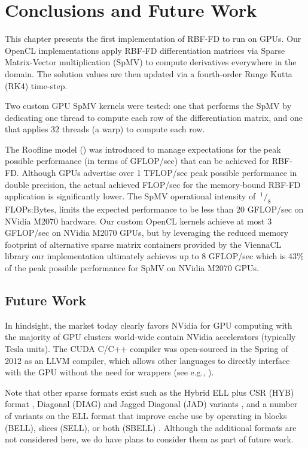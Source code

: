 \documentclass{report}
\begin{document}
\section{Conclusions and Future Work}

This chapter presents the first implementation of RBF-FD to run on GPUs. Our OpenCL implementations apply RBF-FD differentiation matrices via Sparse Matrix-Vector multiplication (SpMV) to compute derivatives everywhere in the domain. The solution values are then updated via a fourth-order Runge Kutta (RK4) time-step. 

Two custom GPU SpMV kernels were tested: one that performs the SpMV by dedicating one thread to compute each row of the differentiation matrix, and one that applies 32 threads (a warp) to compute each row. 

The Roofline model (\cite{Williams2009}) was introduced to manage expectations for the peak possible performance (in terms of GFLOP/sec) that can be achieved for RBF-FD. Although GPUs advertise over 1 TFLOP/sec peak possible performance in double precision, the actual achieved FLOP/sec for the memory-bound RBF-FD application is significantly lower. The SpMV operational intensity of $\ ^{1}/_{8}$ FLOPs:Bytes, limits the expected performance to be less than 20 GFLOP/sec on NVidia M2070 hardware. Our custom OpenCL kernels achieve at most 3 GFLOP/sec on NVidia M2070 GPUs, but by leveraging the reduced memory footprint of alternative sparse matrix containers provided by the ViennaCL library our implementation ultimately achieves up to 8 GFLOP/sec which is 43\% of the peak possible performance for SpMV on NVidia M2070 GPUs.


\subsection{Future Work} 


In hindsight, the market today clearly favors NVidia for GPU computing with the majority of GPU clusters world-wide contain NVidia accelerators (typically Tesla units). The CUDA C/C++ compiler was open-sourced in the Spring of 2012 as an LLVM compiler, which allows other languages to directly interface with the GPU without the need for wrappers (see e.g., \cite{NumbaPro}). 

Note that other sparse formats exist such as the Hybrid ELL plus CSR (HYB) format \cite{Bell2009}, Diagonal (DIAG) and Jagged Diagonal (JAD) variants \cite{LiSaad2010}, and a number of variants on the ELL format that improve cache use by operating in blocks (BELL), slices (SELL), or both (SBELL) \cite{SuKeutzer2012}. Although the additional formats are not considered here, we do have plans to consider them as part of future work. 
\end{document}
